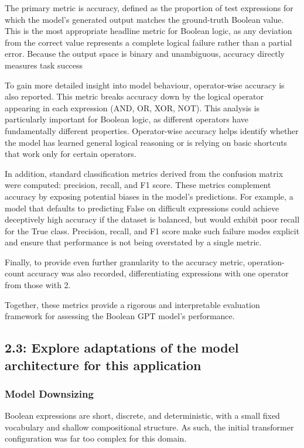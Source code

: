 The primary metric is accuracy, defined as the proportion of test expressions for which the model's generated output matches the ground-truth Boolean value. This is the most appropriate headline metric for Boolean logic, as any deviation from the correct value represents a complete logical failure rather than a partial error. Because the output space is binary and unambiguous, accuracy directly measures task success

To gain more detailed insight into model behaviour, operator-wise accuracy is also reported. This metric breaks accuracy down by the logical operator appearing in each expression (AND, OR, XOR, NOT). This analysis is particularly important for Boolean logic, as different operators have fundamentally different properties. Operator-wise accuracy helps identify whether the model has learned general logical reasoning or is relying on basic shortcuts that work only for certain operators.

In addition, standard classification metrics derived from the confusion matrix were computed: precision, recall, and F1 score. These metrics complement accuracy by exposing potential biases in the model's predictions. For example, a model that defaults to predicting False on difficult expressions could achieve deceptively high accuracy if the dataset is balanced, but would exhibit poor recall for the True class. Precision, recall, and F1 score make such failure modes explicit and ensure that performance is not being overstated by a single metric.

Finally, to provide even further granularity to the accuracy metric, operation-count accuracy was also recorded, differentiating expressions with one operator from those with 2.
    
Together, these metrics provide a rigorous and interpretable evaluation framework for assessing the Boolean GPT model's performance.

\subsection{2.3: Explore adaptations of the model architecture for this application}

\subsubsection{Model Downsizing}

Boolean expressions are short, discrete, and deterministic, with a small fixed vocabulary and shallow compositional structure. As such, the initial transformer configuration was far too complex for this domain.

